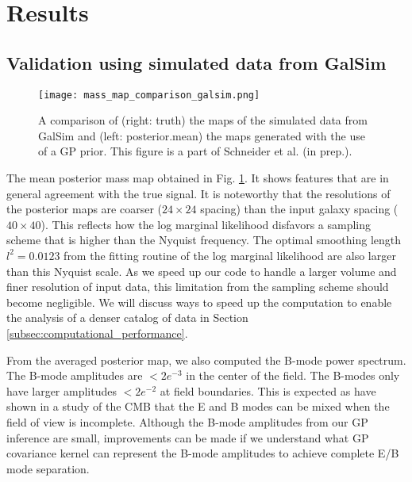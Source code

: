\section{Results}

\subsection{Validation using simulated data from {\sc GalSim}}
\begin{figure}[!ht]
	\centering
	\texttt{[image: mass\_map\_comparison\_galsim.png]}
	\caption{A comparison of (right: truth) the maps of the simulated data from {\sc GalSim}  and
	(left: posterior.mean) the maps generated with the use of a GP prior. 
	This figure is a part of Schneider et al. (in prep.). \label{fig:Galsim_massmap}
}
\end{figure}
The mean posterior mass map obtained in Fig. \ref{fig:Galsim_massmap}. 
It shows features that are in general agreement with the true signal. 
It is noteworthy that the resolutions of the posterior maps are coarser ($24 \times 24$
spacing) than the input galaxy
spacing ($40 \times 40$). This reflects how the log marginal likelihood disfavors a sampling
scheme that is higher than the Nyquist frequency. The optimal smoothing length
$l^2 = 0.0123$ from the fitting routine of the log marginal likelihood are also
larger than this Nyquist scale. As we speed up our code to handle a larger
volume and finer
resolution of input data, this limitation from the sampling scheme should
become negligible. We will discuss ways to speed up the computation to enable
the analysis of a denser catalog of data in Section
\ref{subsec:computational_performance}. 

From the averaged posterior map, we also computed the B-mode power spectrum.
The B-mode amplitudes are $< 2e^{-3}$ in the center of the field. 
The B-modes only have larger amplitudes $< 2e^{-2}$ at field boundaries.  
This is expected as \cite{Bunn2003} have shown in a study of the CMB that 
the E and B modes can be mixed when the field of view is incomplete.
Although the B-mode amplitudes from our GP inference are small, 
improvements can be made 
if we understand what GP covariance kernel can represent the B-mode amplitudes to achieve complete E/B mode
separation.

